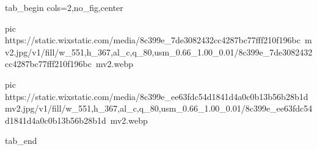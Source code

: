  
 
 
 
 

\ifcmt
  tab_begin cols=2,no_fig,center

     pic https://static.wixstatic.com/media/8c399e_7de3082432cc4287bc77fff210f196bc~mv2.jpg/v1/fill/w_551,h_367,al_c,q_80,usm_0.66_1.00_0.01/8c399e_7de3082432cc4287bc77fff210f196bc~mv2.webp

		 pic https://static.wixstatic.com/media/8c399e_ee63fdc54d1841d4a0c0b13b56b28b1d~mv2.jpg/v1/fill/w_551,h_367,al_c,q_80,usm_0.66_1.00_0.01/8c399e_ee63fdc54d1841d4a0c0b13b56b28b1d~mv2.webp

  tab_end
\fi
